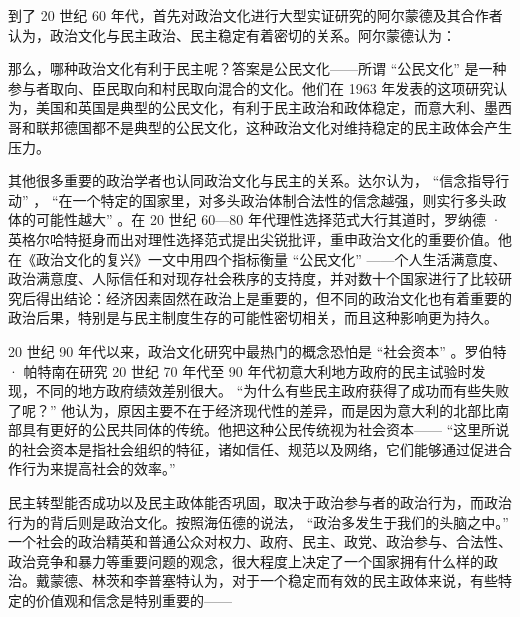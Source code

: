 到了 20 世纪 60 年代，首先对政治文化进行大型实证研究的阿尔蒙德及其合作者认为，政治文化与民主政治、民主稳定有着密切的关系。阿尔蒙德认为：


那么，哪种政治文化有利于民主呢？答案是公民文化——所谓 “公民文化” 是一种参与者取向、臣民取向和村民取向混合的文化。他们在 1963 年发表的这项研究认为，美国和英国是典型的公民文化，有利于民主政治和政体稳定，而意大利、墨西哥和联邦德国都不是典型的公民文化，这种政治文化对维持稳定的民主政体会产生压力。

其他很多重要的政治学者也认同政治文化与民主的关系。达尔认为， “信念指导行动” ， “在一个特定的国家里，对多头政治体制合法性的信念越强，则实行多头政体的可能性越大” 。在 20 世纪 60—80 年代理性选择范式大行其道时，罗纳德 · 英格尔哈特挺身而出对理性选择范式提出尖锐批评，重申政治文化的重要价值。他在《政治文化的复兴》一文中用四个指标衡量 “公民文化” ——个人生活满意度、政治满意度、人际信任和对现存社会秩序的支持度，并对数十个国家进行了比较研究后得出结论：经济因素固然在政治上是重要的，但不同的政治文化也有着重要的政治后果，特别是与民主制度生存的可能性密切相关，而且这种影响更为持久。

20 世纪 90 年代以来，政治文化研究中最热门的概念恐怕是 “社会资本” 。罗伯特 · 帕特南在研究 20 世纪 70 年代至 90 年代初意大利地方政府的民主试验时发现，不同的地方政府绩效差别很大。 “为什么有些民主政府获得了成功而有些失败了呢？” 他认为，原因主要不在于经济现代性的差异，而是因为意大利的北部比南部具有更好的公民共同体的传统。他把这种公民传统视为社会资本—— “这里所说的社会资本是指社会组织的特征，诸如信任、规范以及网络，它们能够通过促进合作行为来提高社会的效率。” 

民主转型能否成功以及民主政体能否巩固，取决于政治参与者的政治行为，而政治行为的背后则是政治文化。按照海伍德的说法， “政治多发生于我们的头脑之中。” 一个社会的政治精英和普通公众对权力、政府、民主、政党、政治参与、合法性、政治竞争和暴力等重要问题的观念，很大程度上决定了一个国家拥有什么样的政治。戴蒙德、林茨和李普塞特认为，对于一个稳定而有效的民主政体来说，有些特定的价值观和信念是特别重要的——

